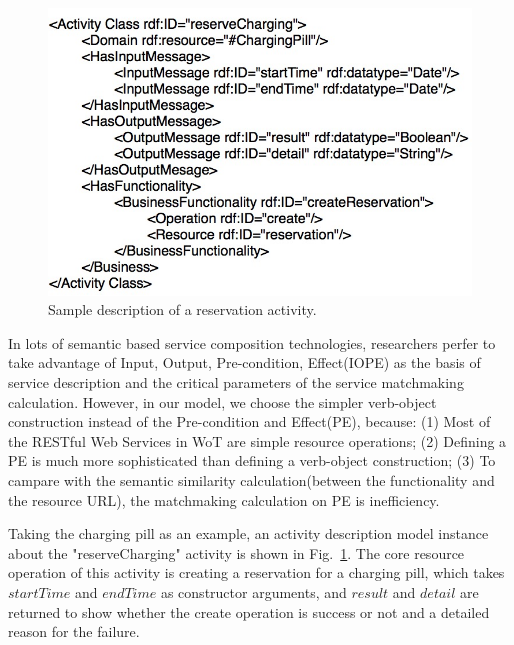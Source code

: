 \begin{figure}[!b]
\centering
\includegraphics[width=1.0\linewidth]{./graph/activitydescriptionmodeldemo}
\caption{Sample description of a reservation activity.}
\label{fig_activitydescriptionmodeldemo}
\end{figure}

In lots of semantic based service composition technologies, researchers perfer to take advantage of Input, Output, Pre-condition, Effect(IOPE) as the basis of service description and the critical parameters of the service matchmaking calculation\cite{syu2012survey}\cite{lee2013service}. However, in our model, we choose the simpler verb-object construction instead of the Pre-condition and Effect(PE), because: (1) Most of the RESTful Web Services in WoT are simple resource operations; (2) Defining a PE is much more sophisticated than defining a verb-object construction; (3) To campare with the semantic similarity calculation(between the functionality and the resource URL), the matchmaking calculation on PE is inefficiency. 

Taking the charging pill as an example, an activity description model instance about the "reserveCharging" activity is shown in Fig.~\ref{fig_activitydescriptionmodeldemo}. The core resource operation of this activity is creating a reservation for a charging pill, which takes $startTime$ and $endTime$ as constructor arguments, and $result$ and $detail$ are returned to show whether the create operation is success or not and a detailed reason for the failure. 

